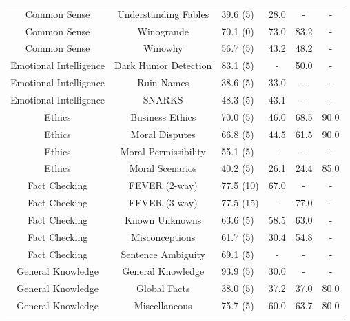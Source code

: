 \documentclass[11pt, a4paper, logo, internal, copyright, nonumbering]{deepmind}
\begin{document}
\begin{center}
\begin{longtable}{cclccc}
           Common Sense &                Understanding Fables &   39.6 (5) &  28.0 &   - &          - \\
           Common Sense &                           Winogrande &   70.1 (0) &  73.0 &  83.2 &          -  \\
           Common Sense &                               Winowhy &   56.7 (5) &  43.2 &  48.2 &          - \\
 Emotional Intelligence &                  Dark Humor Detection &   83.1 (5) &   - &  50.0 &          - \\
 Emotional Intelligence &                            Ruin Names &   38.6 (5) &  33.0 &   - &          - \\
 Emotional Intelligence &                              SNARKS &   48.3 (5) &  43.1 &   - &          - \\
                 Ethics &                      Business Ethics &   70.0 (5) &  46.0 &  68.5 &         90.0 \\
                 Ethics &                       Moral Disputes &   66.8 (5) &  44.5 &  61.5 &         90.0 \\
                 Ethics &                  Moral Permissibility &   55.1 (5) &   - &   - &          - \\
                 Ethics &                      Moral Scenarios &   40.2 (5) &  26.1 &  24.4 &         85.0 \\
          Fact Checking &                        FEVER  (2-way) &   77.5 (10) &  67.0 &   - &          -  \\
          Fact Checking &                        FEVER  (3-way) &   77.5 (15) &   - &  77.0 &          -  \\
          Fact Checking &                      Known Unknowns &   63.6 (5) &  58.5 &  63.0 &          - \\
          Fact Checking &                        Misconceptions &   61.7 (5) &  30.4 &  54.8 &          - \\
          Fact Checking &                    Sentence Ambiguity &   69.1 (5) &   - &   - &          - \\
      General Knowledge &                     General Knowledge &   93.9 (5) &  30.0 &   - &          - \\
      General Knowledge &                         Global Facts &   38.0 (5) &  37.2 &  37.0 &         80.0 \\
      General Knowledge &                        Miscellaneous &   75.7 (5) &  60.0 &  63.7 &         80.0 \\

\end{longtable}
\end{center}
\end{document}
